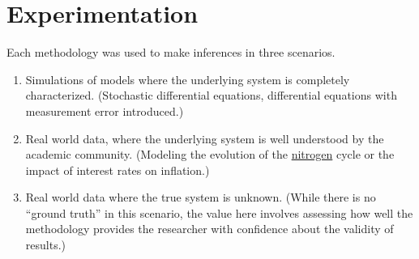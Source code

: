 \documentclass{article}
\begin{document}
\section{Experimentation}

Each methodology was used to make inferences in three scenarios.
\begin{enumerate}
    \item Simulations of models where the underlying system is completely characterized. 
    (Stochastic differential equations, differential equations with measurement error introduced.)
    \item Real world data, where the underlying system is well understood by the academic community.
    (Modeling the evolution of the \href{https://www.sciencedirect.com/science/article/pii/S0045653520316866}{nitrogen}
    cycle or the impact of interest rates on inflation.)
    \item Real world data where the true system is unknown. (While there is no ``ground truth''
    in this scenario, the value here involves assessing how well the methodology provides the
    researcher with confidence about the validity of results.)
\end{enumerate}



\end{document}
